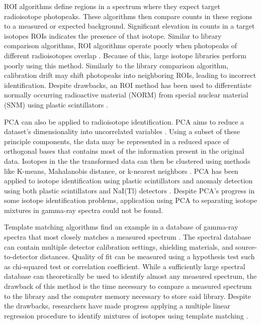 ROI algorithms define regions in a spectrum where they expect target radioisotope photopeaks. These algorithms then compare counts in these regions to a measured or expected background. Significant elevation in counts in a target isotopes ROIs indicates the presence of that isotope. Similar to library comparison algorithms, ROI algorithms operate poorly when photopeaks of different radioisotopes overlap \cite{burr2009}. Because of this, large isotope libraries perform poorly using this method. Similarly to the library comparison algorithm, calibration drift may shift photopeaks into neighboring ROIs, leading to incorrect identification. Despite drawbacks, an ROI method has been used to differentiate normally occurring radioactive material (NORM) from special nuclear material (SNM) using plastic scintillators \cite{Ely2006}.

PCA can also be applied to radioisotope identification. PCA aims to reduce a dataset's dimensionality into uncorrelated variables \cite{Jolliffe2002}. Using a subset of these principle components, the data may be represented in a reduced space of orthogonal bases that contains most of the information present in the original data. Isotopes in the the transformed data can then be clustered using methods like K-means, Mahalanobis distance, or k-nearest neighbors \cite{Kanungo2002, Kumari2012}. PCA has been applied to isotope identification using plastic scintillators \cite{Boardman2012} and anomaly detection using both plastic scintillators and NaI(Tl) detectors \cite{runkle2006b}. Despite PCA's progress in some isotope identification problems, application using PCA to separating isotope mixtures in gamma-ray spectra could not be found.

Template matching algorithms find an example in a database of gamma-ray spectra that most closely matches a measured spectrum \cite{burr2009}. The spectral database can contain multiple detector calibration settings, shielding materials, and source-to-detector distances. Quality of fit can be measured using a hypothesis test such as chi-squared test or correlation coefficient. While a sufficiently large spectral database can theoretically be used to identify almost any measured spectrum, the drawback of this method is the time necessary to compare a measured spectrum to the library and the computer memory necessary to store said library. Despite the drawbacks, researchers have made progress applying a multiple linear regression procedure to identify mixtures of isotopes using template matching \cite{mattingly2010}.

